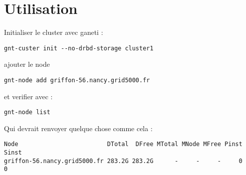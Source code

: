 \section{Utilisation}

Initialiser le cluster avec ganeti :
\begin{lstlisting}
gnt-custer init --no-drbd-storage cluster1
\end{lstlisting}
ajouter le node
\begin{lstlisting}
gnt-node add griffon-56.nancy.grid5000.fr
\end{lstlisting}
et verifier avec :
\begin{lstlisting}
gnt-node list
\end{lstlisting}
Qui devrait renvoyer quelque chose comme cela :
\begin{lstlisting}
Node                         DTotal  DFree MTotal MNode MFree Pinst Sinst
griffon-56.nancy.grid5000.fr 283.2G 283.2G      -     -     -     0     0
\end{lstlisting}

